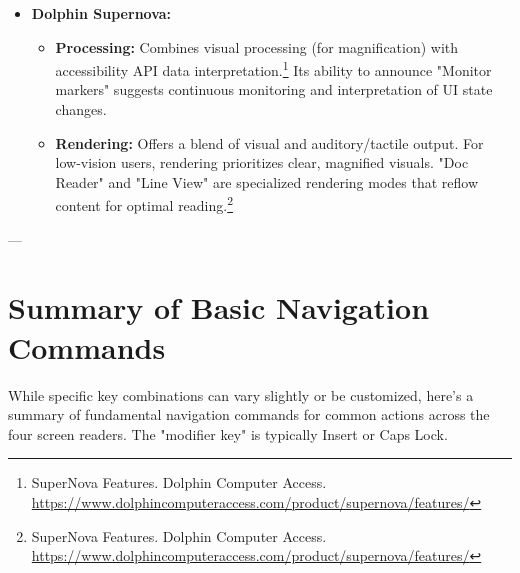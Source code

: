 \begin{itemize}[leftmargin=*,noitemsep,topsep=0pt]
\begin{itemize}[leftmargin=*,noitemsep,topsep=0pt]
        \item \textbf{Processing:} Deeply integrated with the Windows UI Automation framework. Its processing is optimized for the Windows ecosystem.\footnote{Narrator Technical Details. Microsoft Learn. \url{https://learn.microsoft.com/en-us/windows/win32/wnauto/narrator-technical-details}} AI capabilities for image description signify advanced non-textual content interpretation.\footnote{Get image descriptions from Narrator. Microsoft Support. \url{https://support.microsoft.com/en-us/windows/get-image-descriptions-from-narrator-c800c765-b772-4017-8e6c-7f5ddf5b721e}}
        \item \textbf{Rendering:} Aims for a streamlined and integrated experience within Windows. Adapts reading behavior (tab-sequence vs. document reading) based on UI element purpose.\footnote{Narrator Technical Details. Microsoft Learn. \url{https://learn.microsoft.com/en-us/windows/win32/wnauto/narrator-technical-details}}
    \end{itemize}
    \item \textbf{Dolphin Supernova:}
    \begin{itemize}[leftmargin=*,noitemsep,topsep=0pt]
        \item \textbf{Processing:} Combines visual processing (for magnification) with accessibility API data interpretation.\footnote{SuperNova Features. Dolphin Computer Access. \url{https://www.dolphincomputeraccess.com/product/supernova/features/}} Its ability to announce "Monitor markers" suggests continuous monitoring and interpretation of UI state changes.
        \item \textbf{Rendering:} Offers a blend of visual and auditory/tactile output. For low-vision users, rendering prioritizes clear, magnified visuals. "Doc Reader" and "Line View" are specialized rendering modes that reflow content for optimal reading.\footnote{SuperNova Features. Dolphin Computer Access. \url{https://www.dolphincomputeraccess.com/product/supernova/features/}}
    \end{itemize}
\end{itemize}

---

\section{Summary of Basic Navigation Commands}
\label{sec:summary-navigation}

While specific key combinations can vary slightly or be customized, here's a summary of fundamental navigation commands for common actions across the four screen readers. The "modifier key" is typically Insert or Caps Lock.

